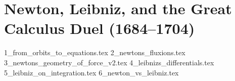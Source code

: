 \section{Newton, Leibniz, and the Great Calculus Duel (1684–1704)}  

{1_from_orbits_to_equations.tex}
{2_newtons_fluxions.tex}
{3_newtons_geometry_of_force_v2.tex}
{4_leibnizs_differentials.tex}
{5_leibniz_on_integration.tex}
{6_newton_vs_leibniz.tex}